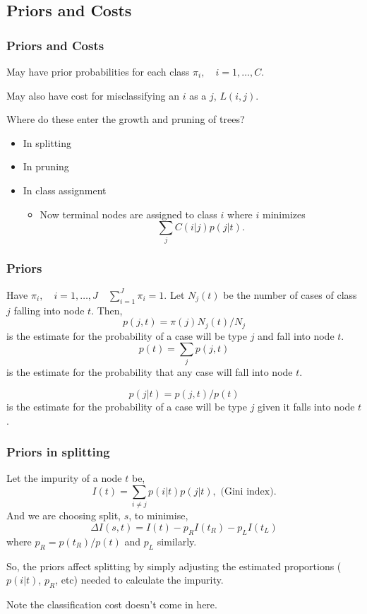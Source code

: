 \documentclass{beamer}
\begin{document}
\subsection{Priors and Costs}
\begin{frame}
	\frametitle{Priors and Costs}
	May have prior probabilities for each class $\pi_i, \quad i=1,\ldots, C$. 
	
	May also have cost for misclassifying an $i$ as a $j$, $L(i,j)$.
	
	Where do these enter the growth and pruning of trees?
	\begin{itemize}
		\item In splitting
		\item In pruning
		\item In class assignment
		\begin{itemize}
			\item Now terminal nodes are assigned to class $i$ where $i$ minimizes
			\[
			\sum_j{C(i|j)p(j|t)}.
			\]
		\end{itemize}
	\end{itemize}

\end{frame}

\begin{frame}
	\frametitle{Priors}
	Have $\pi_i, \quad i=1,\ldots,J \quad \sum_{i=1}^J \pi_i = 1$. Let $N_j(t)$ be the number of cases of class $j$ falling into node $t$.  Then,
	\[
		p(j,t) = \pi(j)N_j(t)/N_j
	\]
	is the estimate for the probability of a case will be type $j$ and fall into node $t$. 
	\[
		p(t) = \sum_j p(j,t)
	\]
	is the estimate for the probability that any case will fall into node $t$. 
	
	\[
		p(j|t) = p(j,t)/p(t)
	\]
	is the estimate for the probability of a case will be type $j$ given it falls into node $t$. 
	
\end{frame}

\begin{frame}
	\frametitle{Priors in splitting}
	Let the impurity of a node $t$ be, 
	\[
	I(t) = \sum_{i\ne j}p(i|t)p(j|t), \text{ (Gini index)}.
	\]
	And we are choosing split, $s$, to minimise,
	\[
	\Delta I(s,t) = I(t) - p_RI(t_R) - p_LI(t_L)
	\]
	where $p_R = p(t_R)/p(t)$ and $p_L$ similarly.
	
	So, the priors affect splitting by simply adjusting the estimated proportions ($p(i|t)$, $p_R$, etc) needed to calculate the impurity.
	
	Note the classification cost doesn't come in here.
\end{frame}
\end{document}
